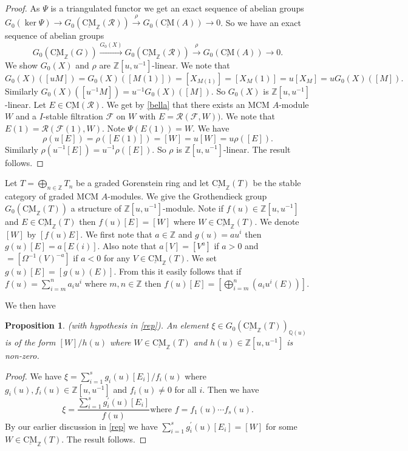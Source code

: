 \documentclass{amsart}
\newcommand{\Z}{\mathbb{Z} }
\newcommand{\Q}{\mathbb{Q} }
\newcommand{\eR}{\mathcal{R} }
\newcommand{\Fc}{\mathcal{F} }
\newcommand{\rt}{\rightarrow}
\newcommand{\CMS}{\operatorname{\underline{CM}}}
\theoremstyle{plain}
\newtheorem{proposition}[theorem]{Proposition}
\theoremstyle{definition}
\theoremstyle{remark}
\begin{document}
{\begin{proof}
  As $\Psi$ is a triangulated functor we get an exact sequence of abelian groups $G_0(\ker \Psi) \rt G_0(\CMS_\Z(\eR)) \xrightarrow{\rho} G_0(\CMS(A)) \rt 0$. So we have an exact sequence of abelian groups
  $$G_0(\CMS_\Z(G)) \xrightarrow{G_0(X)} G_0(\CMS_\Z(\eR)) \xrightarrow{\rho} G_0(\CMS(A)) \rt 0.$$
  We show $G_0(X)$ and $\rho$ are  $\Z[u,u^{-1}]$-linear.
  We note that $$G_0(X)([uM]) = G_0(X)([M(1)]) = [X_{M(1)}] = [X_M(1)] = u[X_M] = uG_0(X)([M]). $$
   Similarly $G_0(X)([u^{-1}M]) = u^{-1}G_0(X)([M])$. So $G_0(X)$ is $\Z[u,u^{-1}]$-linear.
   Let $E  \in \CMS(\eR)$. We get by \ref{bella} that there exists an MCM $A$-module $W$ and a $I$-stable filtration $\Fc$ on $W$  with $E= \eR( \Fc, W))$. We note that $E(1) = \eR(\Fc(1), W)$.
   Note $\Psi(E(1)) = W$. We have $$\rho(u[E]) = \rho([E(1)]) = [W] = u[W] = u \rho([E]).$$
   Similarly   $\rho(u^{-1}[E]) = u^{-1} \rho([E]).$
   So $\rho$ is $\Z[u,u^{-1}]$-linear. The result follows.
\end{proof}

\s \label{rep} Let $T = \bigoplus_{n \in \Z}T_n$ be a graded Gorenstein ring and let $\CMS_\Z(T)$ be the stable category of graded MCM $A$-modules. We give the Grothendieck group $G_0(\CMS_\Z(T))$ a structure of $\Z[u,u^{-1}]$-module. Note if $f(u) \in \Z[u, u^{-1}]$ and $E \in \CMS_\Z(T)$ then $f(u)[E] = [W]$ where $W \in \CMS_\Z(T)$. We denote $[W]$ by $[f(u)E]$. We first note that $a\in \Z$ and $g(u) = au^i$ then $g(u)[E] = a[E(i)] $. Also note that $a[V] = [V^a]$ if $a > 0$ and $= [\Omega^{-1}(V)^{-a}]$ if $a < 0$ for any $V \in \CMS_\Z(T)$. We set $g(u)[E] = [g(u)(E)]$. From this it easily follows that
if $f(u) = \sum_{i = m}^{n}a_iu^i$ where $m,n\in \Z$ then $f(u)[E] = [\bigoplus_{i = m}^{n} (a_iu^i(E))]$.

 We then have
\begin{proposition}\label{rep-lemm}
(with hypothesis in \ref{rep}). An element $\xi \in G_0(\CMS_\Z(T))_{\Q(u)}$ is of the form $[W]/h(u)$ where $W \in \CMS_\Z(T)$ and $h(u) \in \Z[u,u^{-1}]$ is non-zero.
\end{proposition}
\begin{proof}
  We have $\xi = \sum_{i = 1}^{s}g_i(u)[E_i]/f_i(u)$ where $g_i(u), f_i(u) \in \Z[u,u^{-1}]$ and $f_i(u) \neq 0$ for all $i$. Then we have
  $$\xi = \frac{\sum_{i = 1}^{s}g_i^\prime(u)[E_i]}{f(u)} \text{where $f = f_1(u)\cdots f_s(u)$.} $$
  By our earlier discussion in \ref{rep} we have $\sum_{i = 1}^{s}g_i^\prime(u)[E_i] = [W]$ for some $W \in \CMS_\Z(T)$. The result follows.
\end{proof}

}
\end{document}
